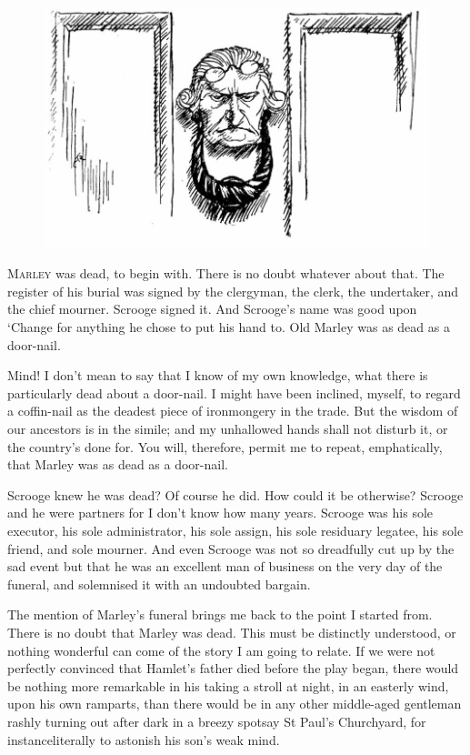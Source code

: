\documentclass[paper=5.5in:8.5in,BCOR=5mm,twoside,DIV=calc,12pt,usegeometry]{scrbook} %
\begin{document}
\renewcommand*{\chaptermarkformat}{}
\begin{figure}[h]
\centering
\includegraphics[width=0.8\linewidth]{knocker}
\end{figure}
\lettrine[loversize=.85]{M}{arley} was dead, to begin with. There is no doubt whatever about that. The register of his burial was signed by the clergyman, the clerk, the undertaker, and the chief mourner. Scrooge signed it. And Scrooge's name was good upon `Change for anything he chose to put his hand to. Old Marley was as dead as a door-nail.

Mind! I don't mean to say that I know of my own knowledge, what there is particularly dead about a door-nail. I might have been inclined, myself, to regard a coffin-nail as the deadest piece of ironmongery in the trade. But the wisdom of our ancestors is in the simile; and my unhallowed hands shall not disturb it, or the country's done for. You will, therefore, permit me to repeat, emphatically, that Marley was as dead as a door-nail.

Scrooge knew he was dead? Of course he did. How could it be otherwise? Scrooge and he were partners for I don't know how many years. Scrooge was his sole executor, his sole administrator, his sole assign, his sole residuary legatee, his sole friend, and sole mourner. And even Scrooge was not so dreadfully cut up by the sad event but that he was an excellent man of business on the very day of the funeral, and solemnised it with an undoubted bargain.

The mention of Marley's funeral brings me back to the point I started from. There is no doubt that Marley was dead. This must be distinctly understood, or nothing wonderful can come of the story I am going to relate. If we were not perfectly convinced that Hamlet's father died before the play began, there would be nothing more remarkable in his taking a stroll at night, in an easterly wind, upon his own ramparts, than there would be in any other middle-aged gentleman rashly turning out after dark in a breezy spot\textemdash say St Paul's Churchyard, for instance\textemdash literally to astonish his son's weak mind.
\end{document}
